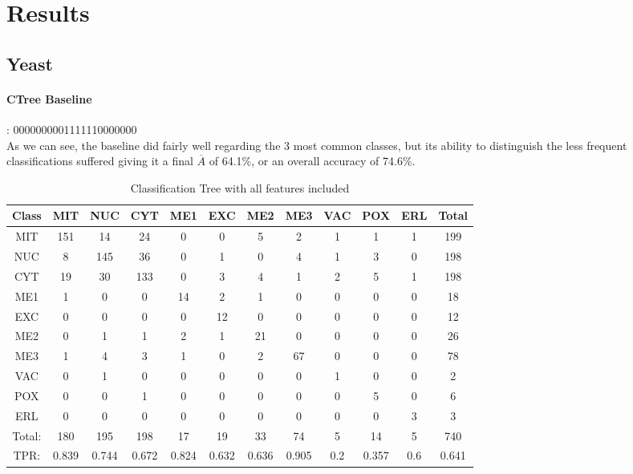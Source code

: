 \section{Results}
\subsection{Yeast}
\paragraph{CTree Baseline}:
0000000001111110000000\\
As we can see, the baseline did fairly well regarding the 3 most common classes, but its ability to distinguish the less frequent classifications suffered giving it a final $\overline{A}$ of 64.1\%, or an overall accuracy of 74.6\%. \\
\begin{table}[h!]
\begin{tabular}{|c|c|c|c|c|c|c|c|c|c|c|c|}
\hline
Class&MIT&NUC&CYT&ME1&EXC&ME2&ME3&VAC&POX&ERL&Total
\\\hline
MIT&151&14&24&0&0&5&2&1&1&1&199\\
NUC&8&145&36&0&1&0&4&1&3&0&198\\
CYT&19&30&133&0&3&4&1&2&5&1&198\\
ME1&1&0&0&14&2&1&0&0&0&0&18\\
EXC&0&0&0&0&12&0&0&0&0&0&12\\
ME2&0&1&1&2&1&21&0&0&0&0&26\\
ME3&1&4&3&1&0&2&67&0&0&0&78\\
VAC&0&1&0&0&0&0&0&1&0&0&2\\
POX&0&0&1&0&0&0&0&0&5&0&6\\
ERL&0&0&0&0&0&0&0&0&0&3&3\\
\hline
Total:&180&195&198&17&19&33&74&5&14&5&740\\
TPR:&0.839&0.744&0.672&0.824&0.632&0.636&0.905&0.2&0.357&0.6&0.641\\
\hline
\end{tabular}
\caption[Yeast: Classification Tree without Feature Selection Confusion Matrix]{Classification Tree with all features included}
\label{tab:yeastctreebase}
\end{table}

